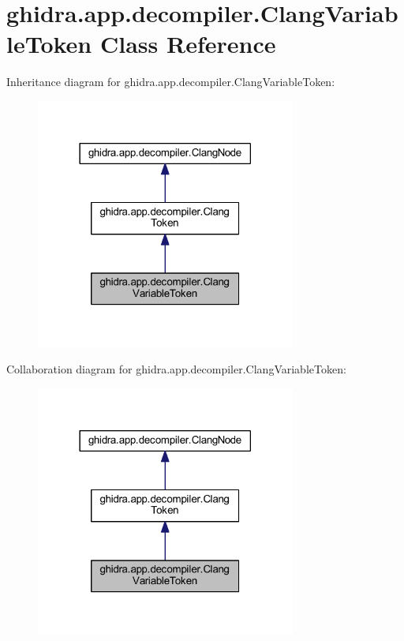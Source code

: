 \hypertarget{classghidra_1_1app_1_1decompiler_1_1_clang_variable_token}{}\section{ghidra.\+app.\+decompiler.\+Clang\+Variable\+Token Class Reference}
\label{classghidra_1_1app_1_1decompiler_1_1_clang_variable_token}


Inheritance diagram for ghidra.\+app.\+decompiler.\+Clang\+Variable\+Token\+:
\nopagebreak
\begin{figure}[H]
\begin{center}
\leavevmode
\includegraphics[width=242pt]{classghidra_1_1app_1_1decompiler_1_1_clang_variable_token__inherit__graph}
\end{center}
\end{figure}


Collaboration diagram for ghidra.\+app.\+decompiler.\+Clang\+Variable\+Token\+:
\nopagebreak
\begin{figure}[H]
\begin{center}
\leavevmode
\includegraphics[width=242pt]{classghidra_1_1app_1_1decompiler_1_1_clang_variable_token__coll__graph}
\end{center}
\end{figure}
